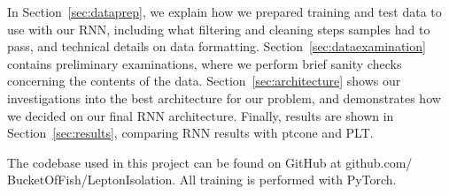 
In Section~\ref{sec:dataprep}, we explain how we prepared training and test data to use with our RNN, including what filtering and cleaning steps samples had to pass, and technical details on data formatting. Section~\ref{sec:dataexamination} contains preliminary examinations, where we perform brief sanity checks concerning the contents of the data. Section~\ref{sec:architecture} shows our investigations into the best architecture for our problem, and demonstrates how we decided on our final RNN architecture. Finally, results are shown in Section~\ref{sec:results}, comparing RNN results with ptcone and PLT.

The codebase used in this project can be found on GitHub at github.com/ BucketOfFish/LeptonIsolation. All training is performed with PyTorch.